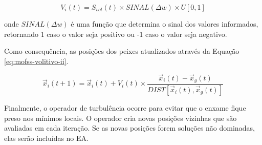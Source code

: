 \begin{equation} \label{eq:mofss-volitivo-i}
    V_{i}(t) = S_{vol}(t) \times SINAL(\Delta w) \times U[0,1]
\end{equation}

onde $SINAL(\Delta w)$ é uma função que determina o sinal dos valores informados, retornando 1 caso o valor seja positivo ou -1 caso o valor seja negativo.

Como consequência, as posições dos peixes atualizados através da Equação \ref{eq:mofss-volitivo-ii}.

\begin{equation} \label{eq:mofss-volitivo-ii}
    \vec{x}_{i}(t + 1) = \vec{x}_{i}(t) + V_{i}(t) \times \frac{\vec{x}_{i}(t) - \vec{x}_{g}(t)}{DIST[\vec{x}_{i}(t), \vec{x}_{g}(t)]}
\end{equation}

Finalmente, o operador de turbulência ocorre para evitar que o enxame fique preso nos mínimos locais. O operador cria novas posições vizinhas que são avaliadas em cada iteração. Se as novas posições forem soluções não dominadas, elas serão incluídas no EA.
